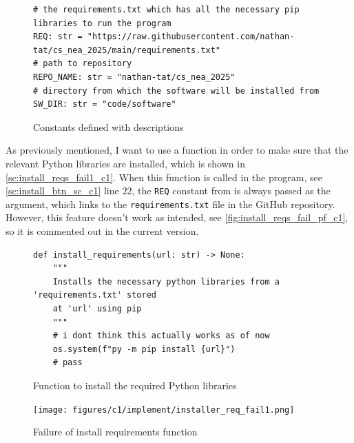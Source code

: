 \documentclass[11pt]{article}
\begin{document}
            \begin{figure}[!ht]
                \begin{verbatim}
# the requirements.txt which has all the necessary pip libraries to run the program 
REQ: str = "https://raw.githubusercontent.com/nathan-tat/cs_nea_2025/main/requirements.txt"
# path to repository
REPO_NAME: str = "nathan-tat/cs_nea_2025"
# directory from which the software will be installed from 
SW_DIR: str = "code/software"
                \end{verbatim}
                \caption{Constants defined with descriptions}
                \label{sc:consts_install_c1}
            \end{figure}

            As previously mentioned, I want to use a function in order to make sure that the relevant Python libraries are installed, which is shown in \autoref{sc:install_reqs_fail1_c1}. When this function is called in the program, see \autoref{sc:install_btn_sc_c1} line 22, the \verb|REQ| constant from is always passed as the argument, which links to the \verb|requirements.txt| file in the GitHub repository. However, this feature doesn't work as intended, see \autoref{fig:install_reqs_fail_pf_c1}, so it is commented out in the current version.

            \begin{figure}[!ht]
                \begin{verbatim}
def install_requirements(url: str) -> None:
    """ 
    Installs the necessary python libraries from a 'requirements.txt' stored  
    at 'url' using pip
    """
    # i dont think this actually works as of now
    os.system(f"py -m pip install {url}")
    # pass
                \end{verbatim}
                \caption{Function to install the required Python libraries}
                \label{sc:install_reqs_fail1_c1}
            \end{figure}

            \begin{figure}[!ht]
                \centering
                \texttt{[image: figures/c1/implement/installer\_req\_fail1.png]}
                \caption{Failure of install requirements function}
                \label{fig:install_reqs_fail_pf_c1}
            \end{figure}
            
\end{document}

